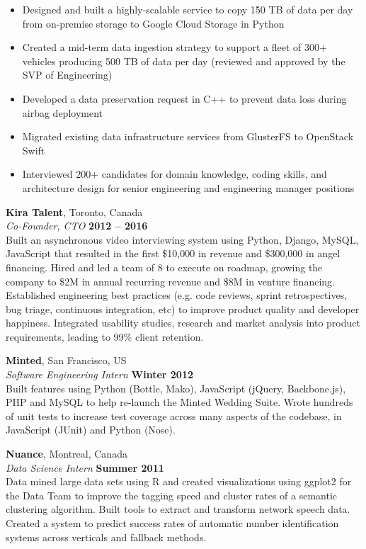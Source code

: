 \documentclass[margin,line]{resume}
\begin{document}
\begin{resume}
    \begin{itemize}
    \item Designed and built a highly-scalable service to copy 150 TB of data per day from on-premise storage to Google Cloud Storage in Python
    \item Created a mid-term data ingestion strategy to support a fleet of 300+ vehicles producing 500 TB of data per day (reviewed and approved by the SVP of Engineering)
    \item Developed a data preservation request in C++ to prevent data loss during airbag deployment
    \item Migrated existing data infrastructure services from GlusterFS to OpenStack Swift
    \item Interviewed 200+ candidates for domain knowledge, coding skills, and architecture design for senior engineering and engineering manager positions
    \end{itemize}
    \vspace{-4mm}
    \textbf{Kira Talent}, Toronto, Canada \vspace{1mm}\\\vspace{1mm}%
    \textsl{Co-Founder, CTO} \hfill \textbf{2012 -- 2016}\\
    Built an asynchronous video interviewing system using Python, Django, MySQL, JavaScript that resulted in the first \$10,000 in revenue and \$300,000 in angel financing. Hired and led a team of 8 to execute on roadmap, growing the company to \$2M in annual recurring revenue and \$8M in venture financing. Established engineering best practices (e.g. code reviews, sprint retrospectives, bug triage, continuous integration, etc) to improve product quality and developer happiness. Integrated usability studies, research and market analysis into product requirements, leading to 99\% client retention.

    \textbf{Minted}, San Francisco, US \vspace{1mm}\\\vspace{1mm}%
    \textsl{Software Engineering Intern} \hfill \textbf{Winter 2012}\\
     Built features using Python (Bottle, Mako), JavaScript (jQuery, Backbone.js), PHP and MySQL to help re-launch the Minted Wedding Suite. Wrote hundreds of unit tests to increase test coverage across many aspects of the codebase, in JavaScript (JUnit) and Python (Nose).
     
    \textbf{Nuance}, Montreal, Canada \vspace{1mm}\\\vspace{1mm}%
    \textsl{Data Science Intern} \hfill \textbf{Summer 2011}\\
    Data mined large data sets using R and created visualizations using ggplot2 for the Data Team to improve the tagging speed and cluster rates of a semantic clustering algorithm. Built tools to extract and transform network speech data. Created a system to predict success rates of automatic number identification systems across verticals and fallback methods.


\end{resume}
\end{document}
